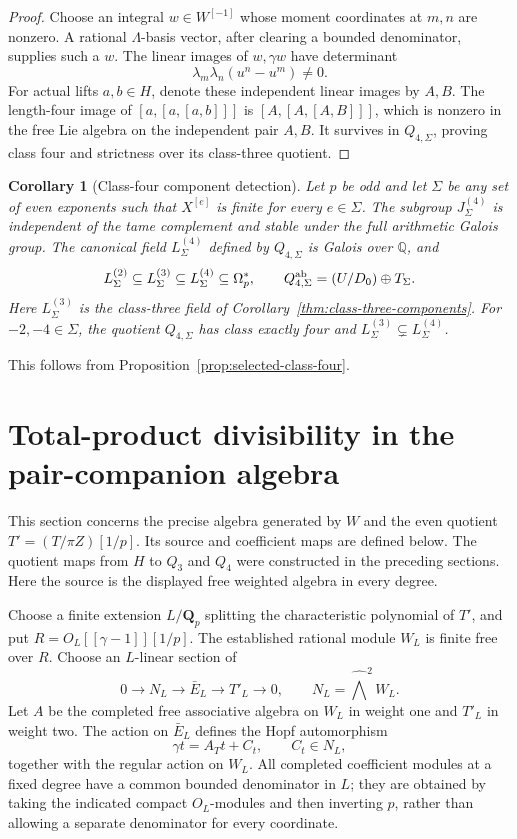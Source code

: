 \documentclass[11pt]{article}
\newtheorem{corollary}[theorem]{Corollary}
\theoremstyle{definition}\newtheorem{definition}[theorem]{Definition}
\begin{document}
\begin{proof}
Choose an integral $w\in W^{[-1]}$ whose moment
coordinates at $m,n$ are nonzero. A rational
$\Lambda$-basis vector, after clearing a bounded
denominator, supplies such a $w$. The linear images
of $w,\gamma w$ have determinant
\[
                   \lambda_m\lambda_n(u^n-u^m)\ne0.
\]
For actual lifts $a,b\in H$, denote these independent
linear images by $A,B$. The length-four image of
$[a,[a,[a,b]]]$ is $[A,[A,[A,B]]]$, which is nonzero
in the free Lie algebra on the independent pair
$A,B$. It survives in $Q_{4,\Sigma}$, proving class
four and strictness over its class-three quotient.
\end{proof}

\begin{corollary}[Class-four component detection]
\label{thm:class-four-components}
Let $p$ be odd and let $\Sigma$ be any set of even exponents
such that $X^{[e]}$ is finite for every $e\in\Sigma$.
The subgroup $J_\Sigma^{(4)}$ is independent of the tame
complement and stable under the full arithmetic Galois group.
The canonical field $L_\Sigma^{(4)}$ defined by $Q_{4,\Sigma}$
is Galois over $\mathbb Q$, and
\[
 L_\Sigma^{(2)}\subseteq L_\Sigma^{(3)}
   \subseteq L_\Sigma^{(4)}\subseteq\Omega_p^*,\qquad
 Q_{4,\Sigma}^{\rm ab}=(U/D_0)\oplus T_\Sigma.
\]
Here $L_\Sigma^{(3)}$ is the class-three field of
Corollary~\ref{thm:class-three-components}.
For $-2,-4\in\Sigma$, the quotient $Q_{4,\Sigma}$ has class
exactly four and $L_\Sigma^{(3)}\subsetneq L_\Sigma^{(4)}$.
\end{corollary}
This follows from Proposition~\ref{prop:selected-class-four}.

\section{Total-product divisibility in the pair-companion algebra}
\label{sec:pair-total-saturation}

This section concerns the precise algebra generated by
$W$ and the even quotient $T'=(T/\pi Z)[1/p]$. Its
source and coefficient maps are defined below. The quotient maps from $H$ to $Q_3$ and $Q_4$ were
constructed in the preceding sections. Here the source
is the displayed free weighted algebra in every degree.

Choose a finite extension $L/\mathbf Q_p$ splitting
the characteristic polynomial of $T'$, and put
$R=O_L[[\gamma-1]][1/p]$. The established rational
module $W_L$ is finite free over $R$. Choose an
$L$-linear section of
\[
 0\longrightarrow N_L\longrightarrow\bar E_L
                  \longrightarrow T'_L\longrightarrow0,
 \qquad N_L=\widehat\bigwedge^2W_L.
\]
Let $A$ be the completed free associative algebra on
$W_L$ in weight one and $T'_L$ in weight two. The
action on $\bar E_L$ defines the Hopf
automorphism
\[
        \gamma t=A_Tt+C_t,\qquad C_t\in N_L,
\]
together with the regular action on $W_L$. All
completed coefficient modules at a fixed degree have
a common bounded denominator in $L$; they are obtained
by taking the indicated compact $O_L$-modules and then
inverting $p$, rather than allowing a separate
denominator for every coordinate.
\end{document}
